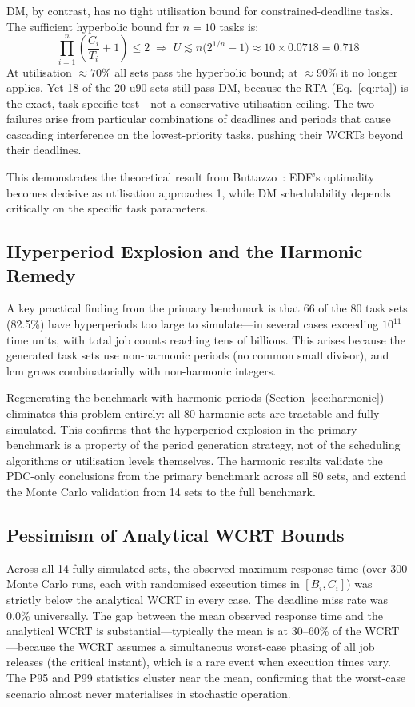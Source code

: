 \documentclass[a4paper,11pt]{article}
\begin{document}
DM, by contrast, has no tight utilisation bound for constrained-deadline tasks. The sufficient
hyperbolic bound for $n = 10$ tasks is:
\[
    \prod_{i=1}^{n}\!\left(\frac{C_i}{T_i} + 1\right) \leq 2
    \;\Longrightarrow\; U \lesssim n\bigl(2^{1/n} - 1\bigr)
    \approx 10 \times 0.0718 = 0.718
\]
At utilisation $\approx 70\%$ all sets pass the hyperbolic bound; at $\approx 90\%$ it no
longer applies. Yet 18 of the 20 u90 sets still pass DM, because the RTA
(Eq.~\eqref{eq:rta}) is the exact, task-specific test---not a conservative utilisation
ceiling. The two failures arise from particular combinations of deadlines and periods that
cause cascading interference on the lowest-priority tasks, pushing their WCRTs beyond their
deadlines.

This demonstrates the theoretical result from Buttazzo~\cite{buttazzo2024}: EDF's optimality
becomes decisive as utilisation approaches 1, while DM schedulability depends critically on
the specific task parameters.

\subsection{Hyperperiod Explosion and the Harmonic Remedy}

A key practical finding from the primary benchmark is that 66 of the 80 task sets (82.5\%)
have hyperperiods too large to simulate---in several cases exceeding $10^{11}$ time units,
with total job counts reaching tens of billions. This arises because the generated task sets
use non-harmonic periods (no common small divisor), and $\mathrm{lcm}$ grows combinatorially
with non-harmonic integers.

Regenerating the benchmark with harmonic periods (Section~\ref{sec:harmonic}) eliminates
this problem entirely: all 80 harmonic sets are tractable and fully simulated. This confirms
that the hyperperiod explosion in the primary benchmark is a property of the period generation
strategy, not of the scheduling algorithms or utilisation levels themselves. The harmonic
results validate the PDC-only conclusions from the primary benchmark across all 80 sets,
and extend the Monte Carlo validation from 14 sets to the full benchmark.

\subsection{Pessimism of Analytical WCRT Bounds}

Across all 14 fully simulated sets, the observed maximum response time (over 300 Monte Carlo
runs, each with randomised execution times in $[B_i, C_i]$) was strictly below the analytical
WCRT in every case. The deadline miss rate was 0.0\% universally. The gap between the mean
observed response time and the analytical WCRT is substantial---typically the mean is at
30--60\% of the WCRT---because the WCRT assumes a simultaneous worst-case phasing of all job
releases (the critical instant), which is a rare event when execution times vary. The P95 and
P99 statistics cluster near the mean, confirming that the worst-case scenario almost never
materialises in stochastic operation.
\end{document}
